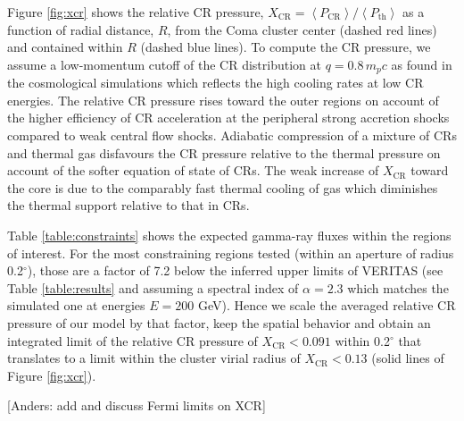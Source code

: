 \documentclass[12pt,manuscript]{aastex}
\newcommand{\expval}[1]{\left\langle #1 \right\rangle}
\newcommand{\rmn}{\mathrm}
\newcommand{\CR}{\mathrm{CR}}
\begin{document}
Figure \ref{fig:xcr} shows the relative CR pressure, $X_{\CR} = \expval{P_{\CR}}/\expval{P_\rmn{th}}$ as a function of radial distance, $R$, from the Coma cluster center (dashed red lines) and contained within $R$ (dashed blue lines). To compute the CR pressure, we assume a low-momentum cutoff of the CR distribution at $q = 0.8\,m_p c$ as found in the cosmological simulations which reflects the high cooling rates at low CR energies. The relative CR pressure rises toward the outer regions on account of the higher efficiency of CR acceleration at the peripheral strong accretion shocks compared to weak central flow shocks. Adiabatic compression of a mixture of CRs and thermal gas disfavours the CR pressure relative to the thermal pressure on account of the softer equation of state of CRs. The weak increase of $X_{\CR}$ toward the core is due to the comparably fast thermal cooling of gas which diminishes the thermal support relative to that in CRs.

Table \ref{table:constraints} shows the expected gamma-ray fluxes within the regions of interest. For the most constraining regions tested (within an aperture of radius 0.2$^{\circ}$), those are a factor of 7.2 below the inferred upper limits of VERITAS (see Table \ref{table:results} and assuming a spectral index of $\alpha=2.3$ which matches the simulated one at energies $E=200$ GeV). Hence we scale the averaged relative CR pressure of our model by that factor, keep the spatial behavior and obtain an integrated limit of the relative CR pressure of $X_{\CR}<0.091$ within 0.2$^{\circ}$ that translates to a limit within the cluster virial radius of $X_\CR<0.13$ (solid lines of Figure \ref{fig:xcr}).

[Anders: add and discuss Fermi limits on XCR]
\end{document}
